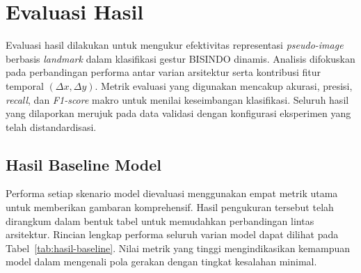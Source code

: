   
\section{Evaluasi Hasil}
\label{sec:evaluasi-hasil}

Evaluasi hasil dilakukan untuk mengukur efektivitas representasi \textit{pseudo-image} berbasis \textit{landmark} dalam klasifikasi gestur BISINDO dinamis.
Analisis difokuskan pada perbandingan performa antar varian arsitektur serta kontribusi fitur temporal $(\Delta x, \Delta y)$.
Metrik evaluasi yang digunakan mencakup akurasi, presisi, \textit{recall}, dan \textit{F1-score} makro untuk menilai keseimbangan klasifikasi.
Seluruh hasil yang dilaporkan merujuk pada data validasi dengan konfigurasi eksperimen yang telah distandardisasi.

\subsection{Hasil Baseline Model}
\label{subsec:hasil-baseline}

Performa setiap skenario model dievaluasi menggunakan empat metrik utama untuk memberikan gambaran komprehensif.
Hasil pengukuran tersebut telah dirangkum dalam bentuk tabel untuk memudahkan perbandingan lintas arsitektur.
Rincian lengkap performa seluruh varian model dapat dilihat pada Tabel~\ref{tab:hasil-baseline}.
Nilai metrik yang tinggi mengindikasikan kemampuan model dalam mengenali pola gerakan dengan tingkat kesalahan minimal.

